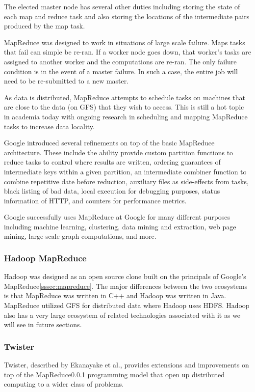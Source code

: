 \documentclass[]{article}
\begin{document}
The elected master node has several other duties including storing the state of each map and reduce task and also storing the locations of the intermediate pairs produced by the map task.

MapReduce was designed to work in situations of large scale failure. Maps tasks that fail can simple be re-ran. If a worker node goes down, that worker's tasks are assigned to another worker and the computations are re-ran. The only failure condition is in the event of a master failure. In such a case, the entire job will need to be re-submitted to a new master.

As data is distributed, MapReduce attempts to schedule tasks on machines that are close to the data (on GFS) that they wish to access. This is still a hot topic in academia today with ongoing research in scheduling and mapping MapReduce tasks to increase data locality.

Google introduced several refinements on top of the basic MapReduce architecture. These include the ability provide custom partition functions to reduce tasks to control where results are written, ordering guarantees of intermediate keys within a given partition, an intermediate combiner function to combine repetitive date before reduction, auxiliary files as side-effects from tasks, black listing of bad data, local execution for debugging purposes, status information of HTTP, and counters for performance metrics.

Google successfully uses MapReduce at Google for many different purposes including machine learning, clustering, data mining and extraction, web page mining, large-scale graph computations, and more.

\subsubsection{Hadoop MapReduce}\label{sssec:hadoop-mapreduce}
Hadoop\cite{white2012hadoop} was designed as an open source clone built on the principals of Google's MapReduce\ref{sssec:mapreduce}. The major differences between the two ecosystems is that MapReduce was written in C++ and Hadoop was written in Java. MapReduce utilized GFS for distributed data where Hadoop uses HDFS. Hadoop also has a very large ecosystem of related technologies associated with it as we will see in future sections. 

\subsubsection{Twister}\label{sssec:twister}
Twister, described by Ekanayake et al.\cite{ekanayake2010twister}, provides extensions and improvements on top of the MapReduce\ref{sssec:hadoop-mapreduce} programming model that open up distributed computing to a wider class of problems. 
\end{document}
